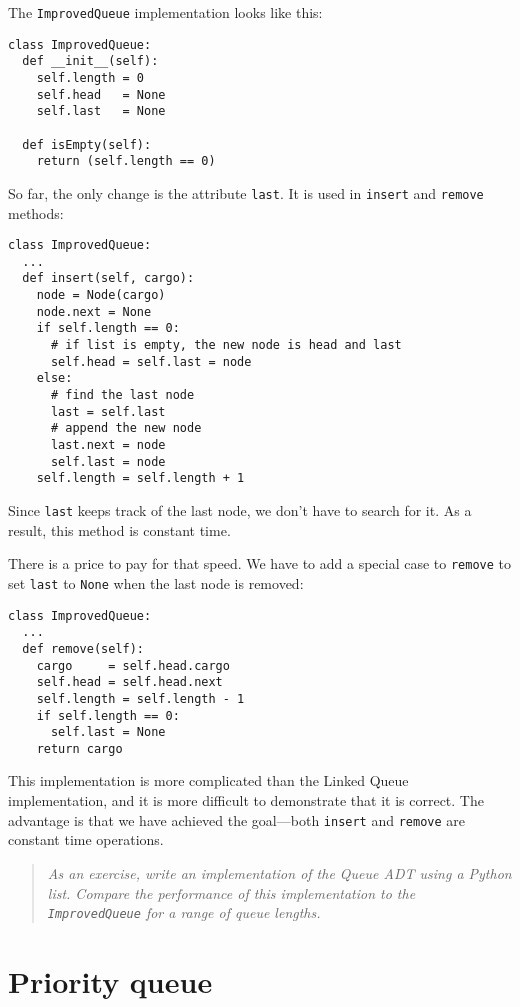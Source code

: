 \beforefig
\centerline{}
\afterfig

The {\tt ImprovedQueue} implementation looks like this:

\beforeverb
\begin{verbatim}
class ImprovedQueue:
  def __init__(self):
    self.length = 0
    self.head   = None
    self.last   = None

  def isEmpty(self):
    return (self.length == 0)
\end{verbatim}
\afterverb
%
So far, the only change is the attribute {\tt last}. It is used in
{\tt insert} and {\tt remove} methods:

\beforeverb
\begin{verbatim}
class ImprovedQueue:
  ...
  def insert(self, cargo):
    node = Node(cargo)
    node.next = None
    if self.length == 0:
      # if list is empty, the new node is head and last
      self.head = self.last = node
    else:
      # find the last node
      last = self.last
      # append the new node
      last.next = node
      self.last = node
    self.length = self.length + 1
\end{verbatim}
\afterverb
%
Since {\tt last} keeps track of the last node, we don't have to search
for it.  As a result, this method is constant time.

There is a price to pay for that speed.  We have to add a special case
to {\tt remove} to set {\tt last} to {\tt None} when the last node is
removed:

\beforeverb
\begin{verbatim}
class ImprovedQueue:
  ...
  def remove(self):
    cargo     = self.head.cargo
    self.head = self.head.next
    self.length = self.length - 1
    if self.length == 0:
      self.last = None
    return cargo
\end{verbatim}
\afterverb
%
This implementation is more complicated than the
Linked Queue implementation, and it is more difficult to demonstrate
that it is correct.  The advantage is that we have achieved
the goal---both {\tt insert} and {\tt remove} are constant time
operations.

\begin{quote}
{\em As an exercise, write an implementation of the Queue ADT using
a Python list.  Compare the performance of this implementation to the
{\tt ImprovedQueue} for a range of queue lengths.}
\end{quote}


\section{Priority queue}

